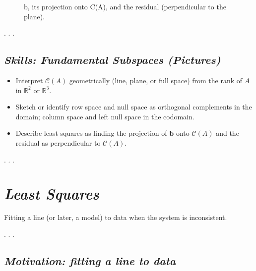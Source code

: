 \documentclass[
  letterpaper,
  DIV=11,
  numbers=noendperiod]{scrartcl}
\providecommand{\tightlist}{%
  \setlength{\itemsep}{0pt}\setlength{\parskip}{0pt}}\usepackage{longtable,booktabs,array}
\begin{document}
\begin{figure}


\caption{\label{fig-projection-colspace}b, its projection onto C(A), and
the residual (perpendicular to the plane).}

\end{figure}%

. . .

\subsection{\texorpdfstring{\emph{Skills: Fundamental Subspaces
(Pictures)}}{Skills: Fundamental Subspaces (Pictures)}}\label{skills-fundamental-subspaces-pictures}

\begin{itemize}
\tightlist
\item
  Interpret \(\mathcal{C}(A)\) geometrically (line, plane, or full
  space) from the rank of \(A\) in \(\mathbb{R}^2\) or \(\mathbb{R}^3\).
\item
  Sketch or identify row space and null space as orthogonal complements
  in the domain; column space and left null space in the codomain.
\item
  Describe least squares as finding the projection of \(\mathbf{b}\)
  onto \(\mathcal{C}(A)\) and the residual as perpendicular to
  \(\mathcal{C}(A)\).
\end{itemize}

. . .

\section{\texorpdfstring{\emph{Least
Squares}}{Least Squares}}\label{least-squares}

Fitting a line (or later, a model) to data when the system is
inconsistent.

. . .

\subsection{\texorpdfstring{\emph{Motivation: fitting a line to
data}}{Motivation: fitting a line to data}}\label{motivation-fitting-a-line-to-data}
\end{document}
